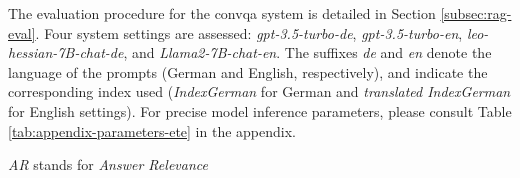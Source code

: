 The evaluation procedure for the \gls{convqa} system is detailed in Section \ref{subsec:rag-eval}. Four system settings are assessed: \textit{gpt-3.5-turbo-de}, \textit{gpt-3.5-turbo-en}, \textit{leo-hessian-7B-chat-de}, and \textit{Llama2-7B-chat-en}. The suffixes \textit{de} and \textit{en} denote the language of the prompts (German and English, respectively), and indicate the corresponding index used (\textit{IndexGerman} for German and \textit{translated IndexGerman} for English settings). For precise model inference parameters, please consult Table \ref{tab:appendix-parameters-ete} in the appendix.

\begin{table}[h]
    \centering
    {\raggedright\footnotesize * \textit{AR} stands for \textit{Answer Relevance}\par}
    \caption{Answer Relevance per Model, Language and Question Type}
    \label{tab:answer-relevance-per-model}
\end{table}

